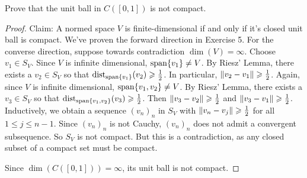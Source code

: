 \documentclass[11pt,twoside,openany]{memoir}
\begin{document}
    \begin{exercise}
        Prove that the unit ball in $C([0,1])$ is not compact.
    \end{exercise}
        \begin{proof}
            Claim: A normed space $V$ is finite-dimensional if and only if it's closed unit ball is compact. We've proven the forward direction in Exercise 5. For the converse direction, suppose towards contradiction $\dim(V) = \infty$. Choose $v_1 \in S_V$. Since $V$ is infinite dimensional, $\operatorname{span}\{v_1\} \neq V$. By Riesz' Lemma, there exists a $v_2 \in S_V$ so that $\operatorname{dist}_{\operatorname{span}\{v_1\}}(v_2) \geqslant \frac{1}{2}$. In particular, $\left\lVert v_2 - v_1 \right\rVert \geqslant \frac{1}{2}$. Again, since $V$ is infinite dimensional, $\operatorname{span}\{v_1,v_2\} \neq V$. By Riesz' Lemma, there exists a $v_3 \in S_V$ so that $\operatorname{dist}_{\operatorname{span}\{v_1,v_2\}}(v_3) \geqslant \frac{1}{2}$. Then $\left\lVert v_3 - v_2 \right\rVert \geqslant \frac{1}{2}$ and $\left\lVert v_3 - v_1 \right\rVert \geqslant \frac{1}{2}$. Inductively, we obtain a sequence $(v_n)_n$ in $S_V$ with $\left\lVert v_n - v_j \right\rVert \geqslant \frac{1}{2}$ for all $1 \leq j \leq n-1$. Since $(v_n)_n$ is not Cauchy, $(v_n)_n$ does not admit a convergent subsequence. So $S_V$ is not compact. But this is a contradiction, as any closed subset of a compact set must be compact.

            Since $\dim(C([0,1])) = \infty$, its unit ball is not compact.
        \end{proof}
\end{document}
